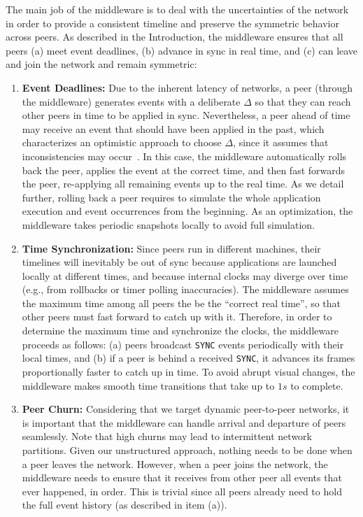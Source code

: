 \documentclass[10pt,journal,compsoc]{IEEEtran}
\newcommand{\code}[1]  {\texttt{\small{#1}}}
\begin{document}
The main job of the middleware is to deal with the uncertainties of the
network in order to provide a consistent timeline and preserve the symmetric
behavior across peers.
As described in the Introduction, the middleware ensures that all peers
    (a) meet event deadlines,
    (b) advance in sync in real time, and
    (c) can leave and join the network and remain symmetric:
%
\begin{enumerate}
\item \textbf{Event Deadlines:}
Due to the inherent latency of networks, a peer (through the middleware)
generates events with a deliberate $\Delta$ so that they can reach other peers
in time to be applied in sync.
Nevertheless, a peer ahead of time may receive an event that should have been
applied in the past, which characterizes an optimistic approach to choose
$\Delta$, since it assumes that inconsistencies may occur~\cite{melding}.
%
In this case, the middleware automatically rolls back the peer, applies the
event at the correct time, and then fast forwards the peer, re-applying all
remaining events up to the real time.
As we detail further, rolling back a peer requires to simulate the whole
application execution and event occurrences from the beginning.
As an optimization, the middleware takes periodic snapshots locally to avoid
full simulation.
%
\item \textbf{Time Synchronization:}
Since peers run in different machines, their timelines will inevitably be out
of sync because applications are launched locally at different times, and
because internal clocks may diverge over time (e.g., from rollbacks or timer
polling inaccuracies).
The middleware assumes the maximum time among all peers the be the
``correct real time'', so that other peers must fast forward to catch up with
it.
Therefore, in order to determine the maximum time and synchronize the clocks,
the middleware proceeds as follows:
    (a) peers broadcast \code{SYNC} events periodically with their local
        times, and
    (b) if a peer is behind a received \code{SYNC}, it advances its frames
        proportionally faster to catch up in time.
%
To avoid abrupt visual changes, the middleware makes smooth time transitions
that take up to $1s$ to complete.
%
\item \textbf{Peer Churn:}
Considering that we target dynamic peer-to-peer networks, it is important that
the middleware can handle arrival and departure of peers seamlessly.
Note that high churns may lead to intermittent network partitions.
Given our unstructured approach, nothing needs to be done when a peer leaves
the network.
However, when a peer joins the network, the middleware needs to ensure that it
receives from other peer all events that ever happened, in order.
This is trivial since all peers already need to hold the full event history (as
described in item (a)).
\end{enumerate}
\end{document}
